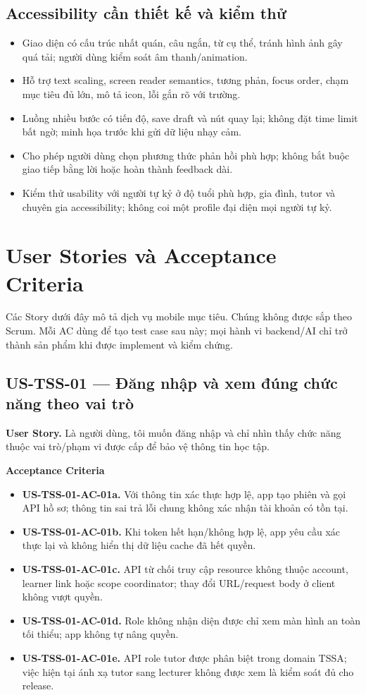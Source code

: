\documentclass[11pt,a4paper]{article}
\newcommand{\ac}[1]{\textbf{\currentstory-AC-#1.}}
\newcommand{\storytitle}[2]{\subsection{#1 — #2}\def\currentstory{#1}}
\newcommand{\story}[1]{\textbf{User Story.} #1\par}
\newcommand{\acceptance}{\textbf{Acceptance Criteria}\par}
\begin{document}
\subsection{Accessibility cần thiết kế và kiểm thử}
\begin{itemize}
  \item Giao diện có cấu trúc nhất quán, câu ngắn, từ cụ thể, tránh hình ảnh gây quá tải; người dùng kiểm soát âm thanh/animation.
  \item Hỗ trợ text scaling, screen reader semantics, tương phản, focus order, chạm mục tiêu đủ lớn, mô tả icon, lỗi gắn rõ với trường.
  \item Luồng nhiều bước có tiến độ, save draft và nút quay lại; không đặt time limit bất ngờ; minh họa trước khi gửi dữ liệu nhạy cảm.
  \item Cho phép người dùng chọn phương thức phản hồi phù hợp; không bắt buộc giao tiếp bằng lời hoặc hoàn thành feedback dài.
  \item Kiểm thử usability với người tự kỷ ở độ tuổi phù hợp, gia đình, tutor và chuyên gia accessibility; không coi một profile đại diện mọi người tự kỷ.
\end{itemize}

\section{User Stories và Acceptance Criteria}

Các Story dưới đây mô tả dịch vụ mobile mục tiêu. Chúng không được sắp theo Scrum. Mỗi AC dùng để tạo test case sau này; mọi hành vi backend/AI chỉ trở thành sản phẩm khi được implement và kiểm chứng.

\storytitle{US-TSS-01}{Đăng nhập và xem đúng chức năng theo vai trò}
\story{Là người dùng, tôi muốn đăng nhập và chỉ nhìn thấy chức năng thuộc vai trò/phạm vi được cấp để bảo vệ thông tin học tập.}
\acceptance
\begin{itemize}
  \item \ac{01a} Với thông tin xác thực hợp lệ, app tạo phiên và gọi API hồ sơ; thông tin sai trả lỗi chung không xác nhận tài khoản có tồn tại.
  \item \ac{01b} Khi token hết hạn/không hợp lệ, app yêu cầu xác thực lại và không hiển thị dữ liệu cache đã hết quyền.
  \item \ac{01c} API từ chối truy cập resource không thuộc account, learner link hoặc scope coordinator; thay đổi URL/request body ở client không vượt quyền.
  \item \ac{01d} Role không nhận diện được chỉ xem màn hình an toàn tối thiểu; app không tự nâng quyền.
  \item \ac{01e} API role tutor được phân biệt trong domain TSSA; việc hiện tại ánh xạ tutor sang lecturer không được xem là kiểm soát đủ cho release.
\end{itemize}
\end{document}
